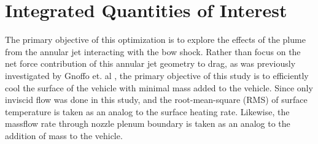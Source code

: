 \section{Integrated Quantities of Interest}

The primary objective of this optimization is to explore the effects of the plume
from the annular jet interacting with the bow shock.  Rather than focus on the
net force contribution of this annular jet geometry to drag, as was previously
investigated by Gnoffo et. al \cite{gnoffo2016tapping}, the primary objective of
this study is to efficiently cool the surface of the vehicle with minimal mass
added to the vehicle.  Since only inviscid flow was done in this study, and the
root-mean-square (RMS) of surface temperature is taken as an analog to the
surface heating rate.  Likewise, the massflow rate through nozzle plenum
boundary is taken as an analog to the addition of mass to the vehicle.

